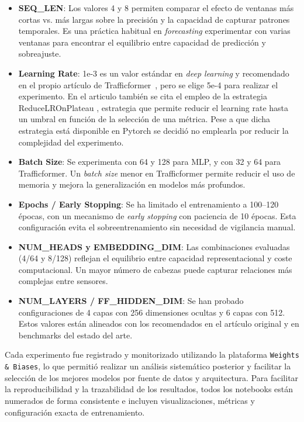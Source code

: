 \begin{itemize}
	\item \textbf{SEQ\_LEN}: Los valores 4 y 8 permiten comparar el efecto de ventanas más cortas vs. más largas sobre la precisión y la capacidad de capturar patrones temporales. Es una práctica habitual en \textit{forecasting} experimentar con varias ventanas para encontrar el equilibrio entre capacidad de predicción y sobreajuste.
	\item \textbf{Learning Rate}: 1e-3 es un valor estándar en \textit{deep learning} y recomendado en el propio artículo de Trafficformer~\cite{trafficformer}, pero se elige 5e-4 para realizar el experimento. En el articulo también se cita el empleo de la estrategia ReduceLROnPlateau \cite{ruder2017overviewgradientdescentoptimization}, estrategia que permite reducir el learning rate hasta un umbral en función de la selección de una métrica. Pese a que dicha estrategia está disponible en Pytorch \cite{pytorchReduceLrOnPLateau} se decidió no emplearla por reducir la complejidad del experimento.
	\item \textbf{Batch Size}: Se experimenta con 64 y 128 para MLP, y con 32 y 64 para Trafficformer. Un \textit{batch size} menor en Trafficformer permite reducir el uso de memoria y mejora la generalización en modelos más profundos.
	\item \textbf{Epochs / Early Stopping}: Se ha limitado el entrenamiento a 100--120 épocas, con un mecanismo de \textit{early stopping} con paciencia de 10 épocas. Esta configuración evita el sobreentrenamiento sin necesidad de vigilancia manual.
	\item \textbf{NUM\_HEADS y EMBEDDING\_DIM}: Las combinaciones evaluadas (4/64 y 8/128) reflejan el equilibrio entre capacidad representacional y coste computacional. Un mayor número de cabezas puede capturar relaciones más complejas entre sensores.
	\item \textbf{NUM\_LAYERS / FF\_HIDDEN\_DIM}: Se han probado configuraciones de 4 capas con 256 dimensiones ocultas y 6 capas con 512. Estos valores están alineados con los recomendados en el artículo original y en benchmarks del estado del arte.
\end{itemize}

Cada experimento fue registrado y monitorizado utilizando la plataforma \texttt{Weights \& Biases}, lo que permitió realizar un análisis sistemático posterior y facilitar la selección de los mejores modelos por fuente de datos y arquitectura. Para facilitar la reproducibilidad y la trazabilidad de los resultados, todos los notebooks están numerados de forma consistente e incluyen visualizaciones, métricas y configuración exacta de entrenamiento.

